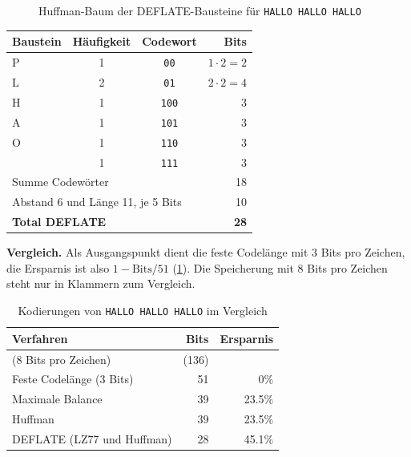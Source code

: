 \begin{myexample}
\begin{figure}[H]
		\caption{Huffman-Baum der DEFLATE-Bausteine für \texttt{HALLO HALLO HALLO}}
		\label{fig:deflate-hallo}
	\end{figure}
	\begin{center}
		\begin{tabular}{lccr}
			\textbf{Baustein} & \textbf{Häufigkeit} & \textbf{Codewort} & \textbf{Bits} \\\midrule
			P & 1 & \texttt{00} & $1 \cdot 2 = 2$ \\
			L & 2 & \texttt{01} & $2 \cdot 2 = 4$ \\
			H & 1 & \texttt{100} & 3 \\
			A & 1 & \texttt{101} & 3 \\
			O & 1 & \texttt{110} & 3 \\
			\textvisiblespace & 1 & \texttt{111} & 3 \\\midrule
			\multicolumn{3}{l}{Summe Codewörter} & 18 \\
			\multicolumn{3}{l}{Abstand 6 und Länge 11, je 5 Bits} & 10 \\
			\multicolumn{3}{l}{\textbf{Total DEFLATE}} & \textbf{28}
		\end{tabular}
	\end{center}

	\textbf{Vergleich.} Als Ausgangspunkt dient die feste Codelänge mit 3 Bits pro Zeichen, die Ersparnis ist also $1 - \text{Bits}/51$ (\cref{table:vergleich-hallo}). Die Speicherung mit 8 Bits pro Zeichen steht nur in Klammern zum Vergleich.
	\begin{table}[H]
		\centering
		\begin{tabular}{lrr}
			\textbf{Verfahren} & \textbf{Bits} & \textbf{Ersparnis} \\\midrule
			(8 Bits pro Zeichen) & (136) & \\
			Feste Codelänge (3 Bits) & 51 & 0\% \\
			Maximale Balance & 39 & 23.5\% \\
			Huffman & 39 & 23.5\% \\
			DEFLATE (LZ77 und Huffman) & 28 & 45.1\%
		\end{tabular}
		\caption{Kodierungen von \texttt{HALLO HALLO HALLO} im Vergleich}
		\label{table:vergleich-hallo}
	\end{table}
\end{myexample}

